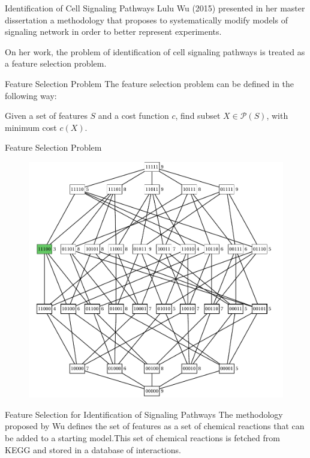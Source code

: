\documentclass{beamer}
\newcommand{\powerset}{\mathcal{P}}
\begin{document}
\begin{frame}{Identification of Cell Signaling Pathways}
Lulu Wu (2015) presented in her master dissertation a methodology that 
proposes to systematically modify models of signaling network in order
to better represent experiments.
\pause

On her work, the problem of identification of cell signaling pathways is
treated as a feature selection problem.
\end{frame}


\begin{frame}{Feature Selection Problem}
The feature selection problem can be defined in the following way:
\begin{center}
Given a set of features $S$ and a cost function $c$, find subset 
        $X \in \powerset (S)$, with minimum cost $c(X)$.
\end{center}

\pause
\end{frame}

\begin{frame}{Feature Selection Problem}
\begin{figure}
    \includegraphics[scale=.37]{introduction/Boolean_lattice.pdf}
\end{figure}
\end{frame}

\begin{frame}{Feature Selection for Identification of Signaling 
Pathways}
The methodology proposed by Wu defines the set of features as a set of 
chemical reactions that can be added to a starting model.\pause This set 
of chemical reactions is fetched from KEGG and stored in a database of
interactions.
\end{frame}
\end{document}
